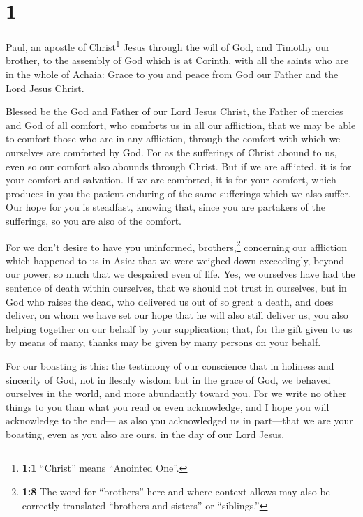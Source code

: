\hypertarget{section}{%
\section{1}\label{section}}

 Paul, an apostle of Christ\footnote{\textbf{1:1}
  ``Christ'' means ``Anointed One''.} Jesus through the will of God, and
Timothy our brother, to the assembly of God which is at Corinth, with
all the saints who are in the whole of Achaia:  Grace to
you and peace from God our Father and the Lord Jesus Christ.

 Blessed be the God and Father of our Lord Jesus Christ,
the Father of mercies and God of all comfort,  who
comforts us in all our affliction, that we may be able to comfort those
who are in any affliction, through the comfort with which we ourselves
are comforted by God.  For as the sufferings of Christ
abound to us, even so our comfort also abounds through Christ.
 But if we are afflicted, it is for your comfort and
salvation. If we are comforted, it is for your comfort, which produces
in you the patient enduring of the same sufferings which we also suffer.
 Our hope for you is steadfast, knowing that, since you
are partakers of the sufferings, so you are also of the comfort.

 For we don't desire to have you uninformed,
brothers,\footnote{\textbf{1:8} The word for ``brothers'' here and where
  context allows may also be correctly translated ``brothers and
  sisters'' or ``siblings.''} concerning our affliction which happened
to us in Asia: that we were weighed down exceedingly, beyond our power,
so much that we despaired even of life.  Yes, we ourselves
have had the sentence of death within ourselves, that we should not
trust in ourselves, but in God who raises the dead,  who
delivered us out of so great a death, and does deliver, on whom we have
set our hope that he will also still deliver us,  you
also helping together on our behalf by your supplication; that, for the
gift given to us by means of many, thanks may be given by many persons
on your behalf.

 For our boasting is this: the testimony of our
conscience that in holiness and sincerity of God, not in fleshly wisdom
but in the grace of God, we behaved ourselves in the world, and more
abundantly toward you.  For we write no other things to
you than what you read or even acknowledge, and I hope you will
acknowledge to the end---  as also you acknowledged us in
part---that we are your boasting, even as you also are ours, in the day
of our Lord Jesus.

